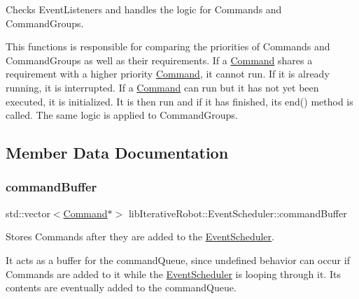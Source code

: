 Checks Event\+Listeners and handles the logic for Commands and Command\+Groups. 

This functions is responsible for comparing the priorities of Commands and Command\+Groups as well as their requirements. If a \mbox{\hyperlink{classlib_iterative_robot_1_1_command}{Command}} shares a requirement with a higher priority \mbox{\hyperlink{classlib_iterative_robot_1_1_command}{Command}}, it cannot run. If it is already running, it is interrupted. If a \mbox{\hyperlink{classlib_iterative_robot_1_1_command}{Command}} can run but it has not yet been executed, it is initialized. It is then run and if it has finished, its end() method is called. The same logic is applied to Command\+Groups. 

\subsection{Member Data Documentation}
\mbox{\label{classlib_iterative_robot_1_1_event_scheduler_a1ddae49a738b69e0e73b4b529a585226}} 
\subsubsection{\texorpdfstring{commandBuffer}{commandBuffer}}
{\footnotesize\ttfamily std\+::vector$<$\mbox{\hyperlink{classlib_iterative_robot_1_1_command}{Command}}$\ast$$>$ lib\+Iterative\+Robot\+::\+Event\+Scheduler\+::command\+Buffer\hspace{0.3cm}{\ttfamily [private]}}



Stores Commands after they are added to the \mbox{\hyperlink{classlib_iterative_robot_1_1_event_scheduler}{Event\+Scheduler}}. 

It acts as a buffer for the command\+Queue, since undefined behavior can occur if Commands are added to it while the \mbox{\hyperlink{classlib_iterative_robot_1_1_event_scheduler}{Event\+Scheduler}} is looping through it. Its contents are eventually added to the command\+Queue. \mbox{\label{classlib_iterative_robot_1_1_event_scheduler_a37b0c1d9ec0c00e7729bec67ebbd9986}} 
